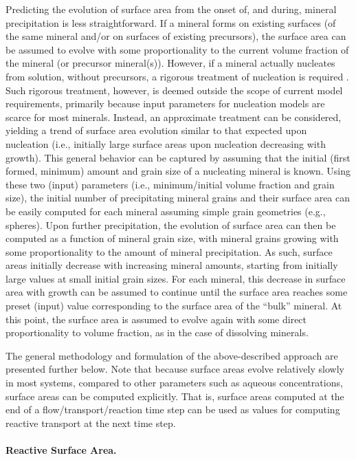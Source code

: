 Predicting the evolution of surface area from the onset of, and
during, mineral precipitation is less straightforward.  If a mineral
forms on existing surfaces (of the same mineral and/or on surfaces of
existing precursors), the surface area can be assumed to evolve with
some proportionality to the current volume fraction of the mineral (or
precursor mineral(s)).  However, if a mineral actually nucleates from
solution, without precursors, a rigorous treatment of nucleation is
required \citep{steefel1990new}.  Such rigorous treatment, however, is
deemed outside the scope of current model requirements, primarily
because input parameters for nucleation models are scarce for most
minerals.  Instead, an approximate treatment can be considered,
yielding a trend of surface area evolution similar to that expected
upon nucleation (i.e., initially large surface areas upon nucleation
decreasing with growth).  This general behavior can be captured by
assuming that the initial (first formed, minimum) amount and grain
size of a nucleating mineral is known.  Using these two (input)
parameters (i.e., minimum/initial volume fraction and grain size), the
initial number of precipitating mineral grains and their surface area
can be easily computed for each mineral assuming simple grain
geometries (e.g., spheres).  Upon further precipitation, the evolution
of surface area can then be computed as a function of mineral grain
size, with mineral grains growing with some proportionality to the
amount of mineral precipitation.  As such, surface areas initially
decrease with increasing mineral amounts, starting from initially
large values at small initial grain sizes.  For each mineral, this
decrease in surface area with growth can be assumed to continue until
the surface area reaches some preset (input) value corresponding to
the surface area of the ``bulk'' mineral.  At this point, the surface
area is assumed to evolve again with some direct proportionality to
volume fraction, as in the case of dissolving minerals.

The general methodology and formulation of the above-described
approach are presented further below.  Note that because surface areas
evolve relatively slowly in most systems, compared to other parameters
such as aqueous concentrations, surface areas can be computed
explicitly.  That is, surface areas computed at the end of a
flow/transport/reaction time step can be used as values for computing
reactive transport at the next time step.

\paragraph{Reactive Surface Area.}

